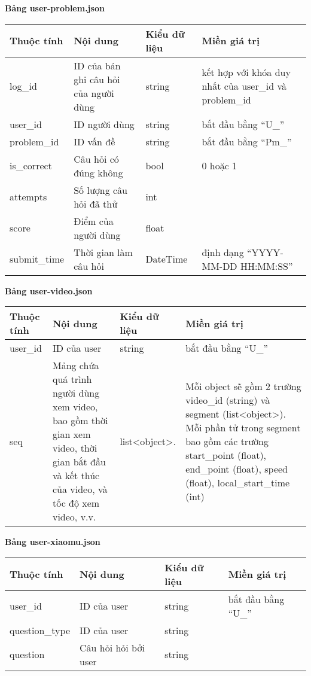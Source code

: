 %
%
\textbf{Bảng user-problem.json}
\begin{center}
\begin{tabular}{|| m{6em}  m{10em}  m{6em}  m{12em}||} 
 \hline
 \textbf{Thuộc tính} & \textbf{Nội dung} & \textbf{Kiểu dữ liệu} & \textbf{Miền giá trị} \\ [0.5ex] 
 \hline\hline
log\_id & ID của bản ghi câu hỏi của người dùng & string & kết hợp với khóa duy nhất của user\_id và problem\_id\\
 \hline
 user\_id &ID người dùng  & string & bắt đầu bằng “U\_” \\ \hline
problem\_id & ID vấn đề &string &bắt đầu bằng “Pm\_”\\
 \hline
is\_correct & Câu hỏi có đúng không  &bool &0 hoặc 1\\ [1ex] 
 \hline
attempts &Số lượng câu hỏi đã thử & int & \\
 \hline
 score &Điểm của người dùng  & float &  \\ \hline
submit\_time & Thời gian làm câu hỏi  &DateTime & định dạng “YYYY-MM-DD HH:MM:SS”\\ [1ex] 
 \hline
\end{tabular}
\end{center}
%
\newpage
\textbf{Bảng user-video.json}
\begin{center}
\begin{tabular}{|| m{6em}  m{12em}  m{7em}  m{12em}||} 
 \hline
 \textbf{Thuộc tính} & \textbf{Nội dung} & \textbf{Kiểu dữ liệu} & \textbf{Miền giá trị} \\ [0.5ex] 
 \hline\hline
user\_id & ID của user & string & bắt đầu bằng “U\_”\\
 \hline
seq & Mảng chứa quá trình người dùng xem video, bao gồm thời gian xem video, thời gian bắt đầu và kết thúc của video, và tốc độ xem video, v.v. &list<object>.  &Mỗi object sẽ gồm 2 trường video\_id (string) và segment (list<object>). Mỗi phần tử trong segment bao gồm các trường start\_point (float), end\_point (float), speed (float), local\_start\_time (int)\\ [1ex] 
 \hline
\end{tabular}
\end{center}
%
\textbf{Bảng user-xiaomu.json}
\begin{center}
\begin{tabular}{|| m{7em}  m{10em}  m{7em}  m{7em}||} 
 \hline
 \textbf{Thuộc tính} & \textbf{Nội dung} & \textbf{Kiểu dữ liệu} & \textbf{Miền giá trị} \\ [0.5ex] 
 \hline\hline
user\_id & ID của user & string & bắt đầu bằng “U\_”\\
 \hline
question\_type & ID của user & string &\\
 \hline
question & Câu hỏi hỏi bởi user &string  &\\ [1ex] 
 \hline
\end{tabular}
\end{center}
